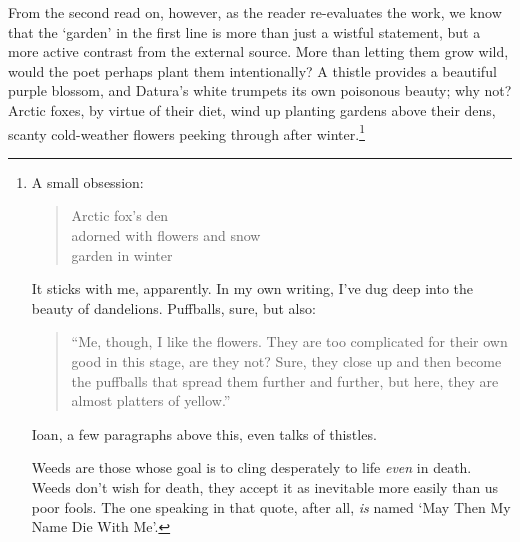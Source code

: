 \documentclass[12pt]{memoir}
\begin{document}
From the second read on, however, as the reader re-evaluates the work, we know that the `garden' in the first line is more than just a wistful statement, but a more active contrast from the external source. More than letting them grow wild, would the poet perhaps plant them intentionally? A thistle provides a beautiful purple blossom, and Datura's white trumpets its own poisonous beauty; why not? Arctic foxes, by virtue of their diet, wind up planting gardens above their dens, scanty cold-weather flowers peeking through after winter.\footnote{A small obsession:\begin{verse}Arctic fox's den \\
adorned with flowers and snow \\
garden in winter\par
\parencite{arkie}
\end{verse}\par
It sticks with me, apparently. In my own writing, I've dug deep into the beauty of dandelions. Puffballs, sure, but also:\begin{quote}
``Me, though, I like the flowers. They are too complicated for their own good in this stage, are they not? Sure, they close up and then become the puffballs that spread them further and further, but here, they are almost platters of yellow.''\par
\parencite[162]{toledot}\end{quote}\par
Ioan, a few paragraphs above this, even talks of thistles.\par
Weeds are those whose goal is to cling desperately to life \emph{even} in death. Weeds don't wish for death, they accept it as inevitable more easily than us poor fools. The one speaking in that quote, after all, \emph{is} named `May Then My Name Die With Me'.}
\end{document}
